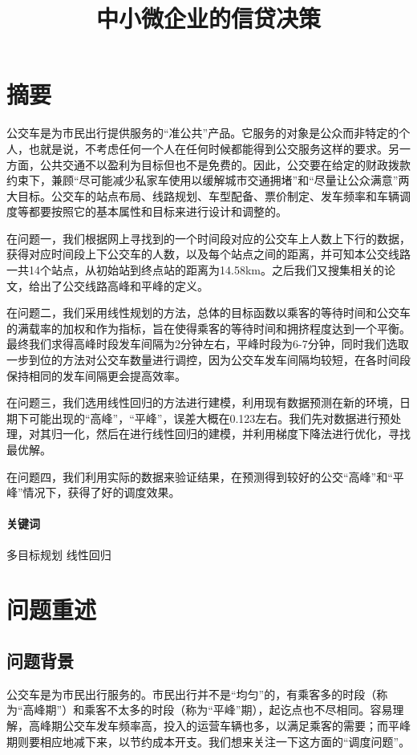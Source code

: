 \documentclass[UTF8]{ctexart}
\title{中小微企业的信贷决策}
\date{}
\begin{document}
	\maketitle
	
	\section*{摘要}
	公交车是为市民出行提供服务的“准公共”产品。它服务的对象是公众而非特定的个人，也就是说，不考虑任何一个人在任何时候都能得到公交服务这样的要求。另一方面，公共交通不以盈利为目标但也不是免费的。因此，公交要在给定的财政拨款约束下，兼顾“尽可能减少私家车使用以缓解城市交通拥堵”和“尽量让公众满意”两大目标。公交车的站点布局、线路规划、车型配备、票价制定、发车频率和车辆调度等都要按照它的基本属性和目标来进行设计和调整的。
	
	在问题一，我们根据网上寻找到的一个时间段对应的公交车上人数上下行的数据，获得对应时间段上下公交车的人数，以及每个站点之间的距离，并可知本公交线路一共14个站点，从初始站到终点站的距离为14.58km。之后我们又搜集相关的论文，给出了公交线路高峰和平峰的定义。
	
	在问题二，我们采用线性规划的方法，总体的目标函数以乘客的等待时间和公交车的满载率的加权和作为指标，旨在使得乘客的等待时间和拥挤程度达到一个平衡。最终我们求得高峰时段发车间隔为2分钟左右，平峰时段为6-7分钟，同时我们选取一步到位的方法对公交车数量进行调控，因为公交车发车间隔均较短，在各时间段保持相同的发车间隔更会提高效率。
	
	在问题三，我们选用线性回归的方法进行建模，利用现有数据预测在新的环境，日期下可能出现的“高峰”，“平峰”，误差大概在0.123左右。我们先对数据进行预处理，对其归一化，然后在进行线性回归的建模，并利用梯度下降法进行优化，寻找最优解。
	
	在问题四，我们利用实际的数据来验证结果，在预测得到较好的公交“高峰”和“平峰”情况下，获得了好的调度效果。
	
	\paragraph{关键词}多目标规划 \quad 线性回归
	\newpage
	
	\section{问题重述}
	\subsection{问题背景}
	公交车是为市民出行服务的。市民出行并不是“均匀”的，有乘客多的时段（称为“高峰期”）和乘客不太多的时段（称为“平峰”期），起讫点也不尽相同。容易理解，高峰期公交车发车频率高，投入的运营车辆也多，以满足乘客的需要；而平峰期则要相应地减下来，以节约成本开支。我们想来关注一下这方面的“调度问题”。
\end{document}
